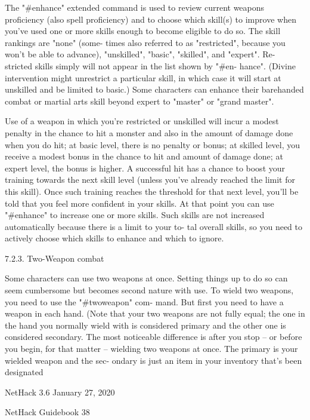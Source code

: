 \documentclass[11pt]{article}
\begin{document}
   The "\#enhance" extended command is used to review current
weapons proficiency (also spell proficiency) and to choose which
skill(s) to improve when you've used one or more skills enough to
become eligible to do so. The skill rankings are "none" (some-
times also referred to as "restricted", because you won't be able
to advance), "unskilled", "basic", "skilled", and "expert".  Re-
stricted skills simply will not appear in the list shown by "\#en-
hance".  (Divine intervention might unrestrict a particular
skill, in which case it will start at unskilled and be limited to
basic.) Some characters can enhance their barehanded combat or
martial arts skill beyond expert to "master" or "grand master".

   Use of a weapon in which you're restricted or unskilled will
incur a modest penalty in the chance to hit a monster and also in
the amount of damage done when you do hit; at basic level, there
is no penalty or bonus; at skilled level, you receive a modest
bonus in the chance to hit and amount of damage done; at expert
level, the bonus is higher. A successful hit has a chance to
boost your training towards the next skill level (unless you've
already reached the limit for this skill).  Once such training
reaches the threshold for that next level, you'll be told that
you feel more confident in your skills. At that point you can
use "\#enhance" to increase one or more skills. Such skills are
not increased automatically because there is a limit to your to-
tal overall skills, so you need to actively choose which skills
to enhance and which to ignore.

7.2.3. Two-Weapon combat

   Some characters can use two weapons at once. Setting things
up to do so can seem cumbersome but becomes second nature with
use. To wield two weapons, you need to use the "\#twoweapon" com-
mand.  But first you need to have a weapon in each hand. (Note
that your two weapons are not fully equal; the one in the hand
you normally wield with is considered primary and the other one
is considered secondary. The most noticeable difference is after
you stop -- or before you begin, for that matter -- wielding two
weapons at once. The primary is your wielded weapon and the sec-
ondary is just an item in your inventory that's been designated


NetHack 3.6                   January 27, 2020





NetHack Guidebook                       38
\end{document}
